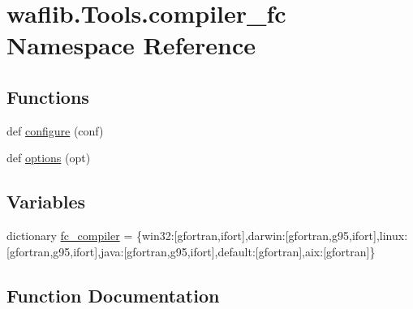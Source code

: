 \hypertarget{namespacewaflib_1_1_tools_1_1compiler__fc}{}\section{waflib.\+Tools.\+compiler\+\_\+fc Namespace Reference}
\label{namespacewaflib_1_1_tools_1_1compiler__fc}
\subsection*{Functions}
\begin{DoxyCompactItemize}
\item 
def \hyperlink{namespacewaflib_1_1_tools_1_1compiler__fc_afb0080302700edcb49f41f58f40aed12}{configure} (conf)
\item 
def \hyperlink{namespacewaflib_1_1_tools_1_1compiler__fc_ad760dedba1ba7a9aa7cfd119667484cd}{options} (opt)
\end{DoxyCompactItemize}
\subsection*{Variables}
\begin{DoxyCompactItemize}
\item 
dictionary \hyperlink{namespacewaflib_1_1_tools_1_1compiler__fc_ae999eaabada8cee583eba8010cb109c1}{fc\+\_\+compiler} = \{\textquotesingle{}win32\textquotesingle{}\+:\mbox{[}\textquotesingle{}gfortran\textquotesingle{},\textquotesingle{}ifort\textquotesingle{}\mbox{]},\textquotesingle{}darwin\textquotesingle{}\+:\mbox{[}\textquotesingle{}gfortran\textquotesingle{},\textquotesingle{}g95\textquotesingle{},\textquotesingle{}ifort\textquotesingle{}\mbox{]},\textquotesingle{}linux\textquotesingle{}\+:\mbox{[}\textquotesingle{}gfortran\textquotesingle{},\textquotesingle{}g95\textquotesingle{},\textquotesingle{}ifort\textquotesingle{}\mbox{]},\textquotesingle{}java\textquotesingle{}\+:\mbox{[}\textquotesingle{}gfortran\textquotesingle{},\textquotesingle{}g95\textquotesingle{},\textquotesingle{}ifort\textquotesingle{}\mbox{]},\textquotesingle{}default\textquotesingle{}\+:\mbox{[}\textquotesingle{}gfortran\textquotesingle{}\mbox{]},\textquotesingle{}aix\textquotesingle{}\+:\mbox{[}\textquotesingle{}gfortran\textquotesingle{}\mbox{]}\}
\end{DoxyCompactItemize}


\subsection{Function Documentation}
